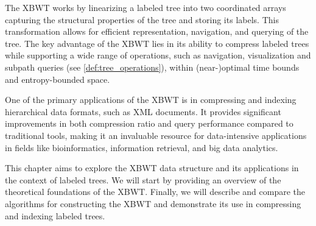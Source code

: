 The XBWT works by linearizing a labeled tree into two coordinated arrays capturing the structural properties of the tree and storing its labels. This transformation allows for efficient representation, navigation, and querying of the tree. The key advantage of the XBWT lies in its ability to compress labeled trees while supporting a wide range of operations, such as navigation, visualization and subpath queries (see \cref{def:tree_operations}), within (near-)optimal time bounds and entropy-bounded space.

One of the primary applications of the XBWT is in compressing and indexing hierarchical data formats, such as XML documents. It provides significant improvements in both compression ratio and query performance compared to traditional tools, making it an invaluable resource for data-intensive applications in fields like bioinformatics, information retrieval, and big data analytics.

This chapter aims to explore the XBWT data structure and its applications in the context of labeled trees. We will start by providing an overview of the theoretical foundations of the XBWT. Finally, we will describe and compare the algorithms for constructing the XBWT and demonstrate its use in compressing and indexing labeled trees.

\begin{comment}
\subsection{How it Works}
The transformation process of the XBWT is as follows:
\begin{enumerate}
    \item \textbf{Path Sorting:} The labeled tree is linearized by sorting its nodes based on the \emph{paths} from each node's parent to the root. The resulting order groups nodes with similar upward paths together, clustering related labels.
    \item \textbf{Array Construction:} Two arrays, \( S_{\text{last}} \) and \( S_{\alpha} \), are generated:
    \begin{itemize}
        \item \( S_{\text{last}} \) stores structural information, such as whether a node is the last child of its parent. This encodes the tree structure without the need for explicit pointers.
        \item \( S_{\alpha} \) stores the labels of the nodes in the sorted order determined by their upward-path sorting.
    \end{itemize}
    \item \textbf{Compression:} Both \( S_{\text{last}} \) and \( S_{\alpha} \) are highly compressible due to the clustering of similar labels and structural redundancy.
\end{enumerate}
\end{comment}

